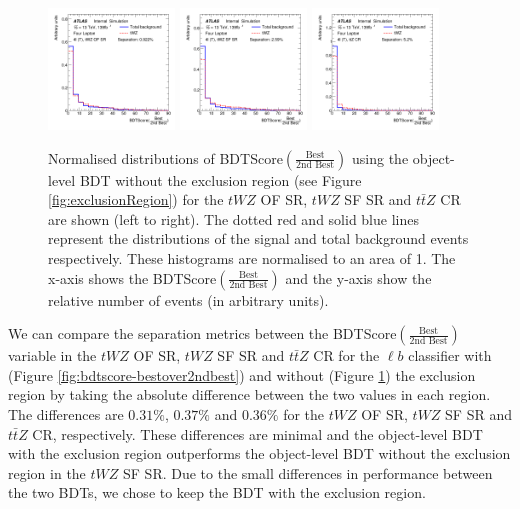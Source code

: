 \begin{figure}
    \centering
    \includegraphics[width=0.3\textwidth]{figures/bdtPlots/lep4_tWZ_4T_OF_BDT_Score_bestOver2ndBest_sep.png}
    \includegraphics[width=0.3\textwidth]{figures/bdtPlots/lep4_tWZ_4T_SF_BDT_Score_bestOver2ndBest_sep.png}
    \includegraphics[width=0.3\textwidth]{figures/bdtPlots/lep4_ttZ_4T_BDT_Score_bestOver2ndBest_sep.png}
    \caption{Normalised distributions of BDTScore$(\frac{\text{Best}}{\text{2nd Best}})$ using the object-level BDT without the exclusion region (see Figure \ref{fig:exclusionRegion}) for the $tWZ$ OF SR, $tWZ$ SF SR and $t\bar{t}Z$ CR are shown (left to right). The dotted red and solid blue lines represent the distributions of the signal and total background events respectively. These histograms are normalised to an area of 1. The x-axis shows the BDTScore$(\frac{\text{Best}}{\text{2nd Best}})$ and the y-axis show the relative number of events (in arbitrary units).}
    \label{fig:exclusionRegion-normplots}
\end{figure}

We can compare the separation metrics between the BDTScore$(\frac{\text{Best}}{\text{2nd Best}})$ variable in the $tWZ$ OF SR, $tWZ$ SF SR and $t\bar{t}Z$ CR for the $\ell b$ classifier with (Figure \ref{fig:bdtscore-bestover2ndbest}) and without (Figure \ref{fig:exclusionRegion-normplots}) the exclusion region by taking the absolute difference between the two values in each region. The differences are $0.31\%$, $0.37\%$ and $0.36\%$ for the $tWZ$ OF SR, $tWZ$ SF SR and $t\bar{t}Z$ CR, respectively. These differences are minimal and the object-level BDT with the exclusion region outperforms the object-level BDT without the exclusion region in the $tWZ$ SF SR. Due to the small differences in performance between the two BDTs, we chose to keep the BDT with the exclusion region.

